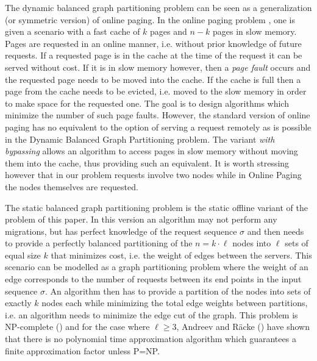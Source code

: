 \documentclass[a4paper,UKenglish,cleveref, autoref, thm-restate,authorcolumns]{lipics-v2019}
\begin{document}
The dynamic balanced graph partitioning problem 
can be seen as a generalization (or symmetric version) of online paging.
In the online paging problem \cite{Fiat2002}, \cite{Epstein2011}
 one is given a scenario with a fast cache of $k$ pages and $n-k$ pages in slow memory. Pages are requested in an online manner, i.e. without prior knowledge of future requests. If a requested page is in the cache at the time of the request it can be served without cost. If it is in slow memory however, then a \textit{page fault} occurs and the requested page needs to be moved into the cache. If the cache is full then a page from the cache needs to be evicted, i.e. moved to the slow memory in order to make space for the requested one. The goal is to design algorithms which minimize the number of such page faults.
However, the standard version of online paging has no equivalent to the option of serving a request remotely as is possible in the Dynamic Balanced Graph Partitioning problem. The variant \textit{with bypassing} allows an algorithm to access pages in slow memory without moving them into the cache, thus providing such an equivalent. It is worth stressing however that in our problem requests involve two nodes while in Online Paging the nodes themselves are requested.

The static balanced graph partitioning problem is the static offline variant of the problem of this paper. In this version an algorithm may not perform any migrations, but has perfect knowledge of the request sequence $\sigma$ and then needs to provide a perfectly balanced partitioning of the $n=k\cdot \ell$ nodes into $\ell$ sets of equal size $k$ that minimizes cost, i.e. the weight of edges between the servers. This scenario can be modelled as a graph partitioning problem where the weight of an edge corresponds to the number of requests between its end points in the input sequence $\sigma$. 
An algorithm then has to provide a partition of the nodes into sets of exactly $k$ nodes each while minimizing the total edge weights between partitions, i.e. an algorithm needs to minimize the edge cut of the graph.  
This problem is NP-complete (\cite{Andreev2006}) and for the case where $\ell\geq 3$, Andreev and R\"acke (\cite{Andreev2006}) have shown that there is no polynomial time approximation algorithm which guarantees a finite approximation factor unless P=NP.
\end{document}
